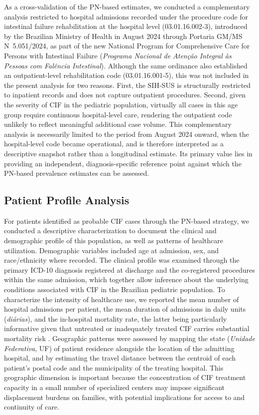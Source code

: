 \documentclass[12pt,a4paper]{article}
\theoremstyle{plain}
\theoremstyle{definition}
\theoremstyle{remark}
\begin{document}
As a cross-validation of the PN-based estimates, we conducted a complementary analysis restricted to hospital admissions recorded under the procedure code for intestinal failure rehabilitation at the hospital level (03.01.16.002-3), introduced by the Brazilian Ministry of Health in August 2024 through Portaria GM/MS N\textordmasculine~5.051/2024, as part of the new National Program for Comprehensive Care for Persons with Intestinal Failure (\textit{Programa Nacional de Aten\c{c}\~ao Integral \`{a}s Pessoas com Fal\^{e}ncia Intestinal}). Although the same ordinance also established an outpatient-level rehabilitation code (03.01.16.001-5), this was not included in the present analysis for two reasons. First, the SIH-SUS is structurally restricted to inpatient records and does not capture outpatient procedures. Second, given the severity of CIF in the pediatric population, virtually all cases in this age group require continuous hospital-level care, rendering the outpatient code unlikely to reflect meaningful additional case volume. This complementary analysis is necessarily limited to the period from August 2024 onward, when the hospital-level code became operational, and is therefore interpreted as a descriptive snapshot rather than a longitudinal estimate. Its primary value lies in providing an independent, diagnosis-specific reference point against which the PN-based prevalence estimates can be assessed.

\subsection*{Patient Profile Analysis}

For patients identified as probable CIF cases through the PN-based strategy, we conducted a descriptive characterization to document the clinical and demographic profile of this population, as well as patterns of healthcare utilization. Demographic variables included age at admission, sex, and race/ethnicity where recorded. The clinical profile was examined through the primary ICD-10 diagnosis registered at discharge and the co-registered procedures within the same admission, which together allow inference about the underlying conditions associated with CIF in the Brazilian pediatric population. To characterize the intensity of healthcare use, we reported the mean number of hospital admissions per patient, the mean duration of admissions in daily units (\textit{di\'{a}rias}), and the in-hospital mortality rate, the latter being particularly informative given that untreated or inadequately treated CIF carries substantial mortality risk \cite{mukhopadhyay2019}. Geographic patterns were assessed by mapping the state (\textit{Unidade Federativa}, UF) of patient residence alongside the location of the admitting hospital, and by estimating the travel distance between the centroid of each patient's postal code and the municipality of the treating hospital. This geographic dimension is important because the concentration of CIF treatment capacity in a small number of specialized centers may impose significant displacement burdens on families, with potential implications for access to and continuity of care.
\end{document}
